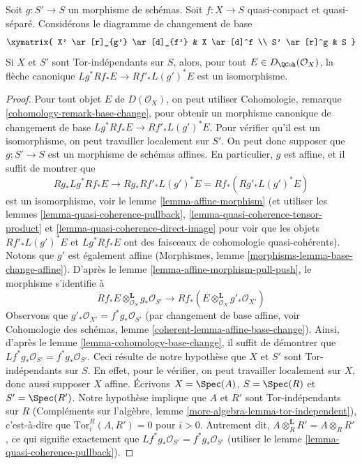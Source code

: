 \begin{lemma}
\label{lemma-compare-base-change}
Soit $g : S' \to S$ un morphisme de schémas.
Soit $f : X \to S$ quasi-compact et quasi-séparé.
Considérons le diagramme de changement de base
$$
\xymatrix{
X' \ar[r]_{g'} \ar[d]_{f'} &
X \ar[d]^f \\
S' \ar[r]^g &
S
}
$$
Si $X$ et $S'$ sont Tor-indépendants sur $S$, alors, pour tout
$E \in D_\QCoh(\mathcal{O}_X)$, la flèche canonique
$Lg^*Rf_*E \to Rf'_*L(g')^*E$ est un isomorphisme.
\end{lemma}

\begin{proof}
Pour tout objet $E$ de $D(\mathcal{O}_X)$, on peut utiliser
Cohomologie, remarque \ref{cohomology-remark-base-change}, pour obtenir un morphisme
canonique de changement de base $Lg^*Rf_*E \to Rf'_*L(g')^*E$. Pour vérifier qu'il
est un isomorphisme, on peut travailler localement sur $S'$. On peut donc supposer que
$g : S' \to S$ est un morphisme de schémas affines. En particulier, $g$
est affine, et il suffit de montrer que
$$
Rg_*Lg^*Rf_*E \to Rg_*Rf'_*L(g')^*E = Rf_*(Rg'_* L(g')^* E)
$$
est un isomorphisme, voir le lemme \ref{lemma-affine-morphism}
(et utiliser les lemmes \ref{lemma-quasi-coherence-pullback},
\ref{lemma-quasi-coherence-tensor-product} et
\ref{lemma-quasi-coherence-direct-image}
pour voir que les objets $Rf'_*L(g')^*E$ et $Lg^*Rf_*E$
ont des faisceaux de cohomologie quasi-cohérents). Notons que $g'$ est
également affine (Morphismes, lemme \ref{morphisms-lemma-base-change-affine}).
D'après le lemme \ref{lemma-affine-morphism-pull-push}, le morphisme s'identifie à
$$
Rf_*E \otimes_{\mathcal{O}_S}^\mathbf{L} g_*\mathcal{O}_{S'}
\longrightarrow
Rf_*(E \otimes_{\mathcal{O}_X}^\mathbf{L} g'_*\mathcal{O}_{X'})
$$
Observons que $g'_*\mathcal{O}_{X'} = f^*g_*\mathcal{O}_{S'}$ (par changement
de base affine, voir Cohomologie des schémas, lemme
\ref{coherent-lemma-affine-base-change}).
Ainsi, d'après le
lemme \ref{lemma-cohomology-base-change}, il suffit de démontrer que
$Lf^*g_*\mathcal{O}_{S'} = f^*g_*\mathcal{O}_{S'}$. Ceci résulte de notre
hypothèse que $X$ et $S'$ sont Tor-indépendants sur $S$. En effet, pour
le vérifier, on peut travailler localement sur $X$, donc aussi supposer $X$ affine.
Écrivons $X = \Spec(A)$, $S = \Spec(R)$ et $S' = \Spec(R')$. Notre hypothèse
implique que $A$ et $R'$ sont Tor-indépendants sur $R$
(Compléments sur l'algèbre, lemme \ref{more-algebra-lemma-tor-independent}), c'est-à-dire que
$\text{Tor}_i^R(A, R') = 0$ pour $i > 0$. Autrement dit,
$A \otimes_R^\mathbf{L} R' = A \otimes_R R'$, ce qui signifie exactement
que $Lf^*g_*\mathcal{O}_{S'} = f^*g_*\mathcal{O}_{S'}$
(utiliser le lemme \ref{lemma-quasi-coherence-pullback}).
\end{proof}

